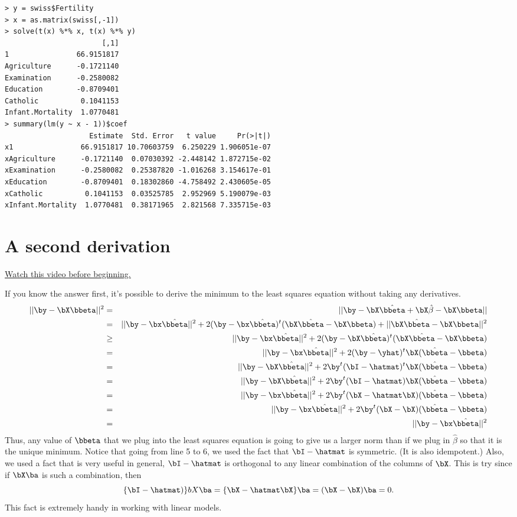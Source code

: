 \begin{verbatim}
> y = swiss$Fertility
> x = as.matrix(swiss[,-1])
> solve(t(x) %*% x, t(x) %*% y)
                       [,1]
1                66.9151817
Agriculture      -0.1721140
Examination      -0.2580082
Education        -0.8709401
Catholic          0.1041153
Infant.Mortality  1.0770481
> summary(lm(y ~ x - 1))$coef
                    Estimate  Std. Error   t value     Pr(>|t|)
x1                66.9151817 10.70603759  6.250229 1.906051e-07
xAgriculture      -0.1721140  0.07030392 -2.448142 1.872715e-02
xExamination      -0.2580082  0.25387820 -1.016268 3.154617e-01
xEducation        -0.8709401  0.18302860 -4.758492 2.430605e-05
xCatholic          0.1041153  0.03525785  2.952969 5.190079e-03
xInfant.Mortality  1.0770481  0.38171965  2.821568 7.335715e-03
\end{verbatim}

\section{A second derivation}
\href{https://www.youtube.com/watch?v=4aCJQiacet8&index=23&list=PLpl-gQkQivXhdgUCdaUQcdb31CRe8Mm2y}{Watch this video before beginning.}


If you know the answer first, it's possible to derive the 
minimum to the least squares equation without taking any derivatives.
\begin{eqnarray*}
|| \by - \bX \bbeta ||^2 &=& || \by - \bX \hat \bbeta + \bX\hat \beta - \bX \bbeta || \\
& = & ||\by - \bx \hat \bbeta||^2
+ 2 (\by - \bx \hat \bbeta)^t (\bX \hat \bbeta - \bX \bbeta)
+ ||\bX \hat \bbeta - \bX \bbeta||^2 \\
& \geq & ||\by - \bx \hat \bbeta||^2
+ 2 (\by - \bX \hat \bbeta)^t (\bX \hat \bbeta - \bX \bbeta) \\
& = & ||\by - \bx \hat \bbeta||^2
+ 2 (\by - \yhat)^t \bX (\hat \bbeta - \bbeta) \\
& = & ||\by - \bX \hat \bbeta||^2
+ 2 \by^t(\bI - \hatmat )^t \bX (\hat \bbeta - \bbeta) \\
& = & ||\by - \bX \hat \bbeta||^2
+ 2 \by^t(\bI - \hatmat ) \bX (\hat \bbeta - \bbeta) \\
& = & ||\by - \bx \hat \bbeta||^2
+ 2 \by^t(\bX - \hatmat \bX )(\hat \bbeta - \bbeta) \\
& = & ||\by - \bx \hat \bbeta||^2
+ 2 \by^t(\bX - \bX )(\hat \bbeta - \bbeta) \\
& = & ||\by - \bx \hat \bbeta||^2
\end{eqnarray*}
Thus, any value of $\bbeta$ that we plug into the least squares equation
is going to give us a larger norm than if we plug in $\hat \beta$ so that
it is the unique minimum.
Notice that going from line 5 to 6, we used the fact that $\bI - \hatmat$ is symmetric. (It is also idempotent.) Also, we used a fact that is very
useful in general, $\bI - \hatmat$ is orthogonal to any linear combination
of the columns of $\bX$. This is try since if $\bX \ba$ is such a combination,
then
$$
\{\bI - \hatmat)\}bX \ba = \{\bX - \hatmat \bX\}\ba = (\bX - \bX) \ba = 0.
$$
This fact is extremely handy in working with linear models. 

